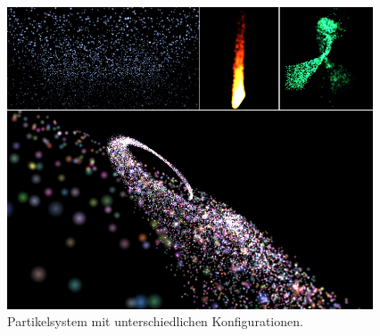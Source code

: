 \begin{Spacing}{\mylinespace}
\begin{figure}[h!]
	\centering
	\vspace*{30px}
	\includegraphics[width=410px]{graphics/ParticleResults.png}
	\caption{Partikelsystem mit unterschiedlichen Konfigurationen.}
	\label{fig:particleResults}
\end{figure}

\end{Spacing}
\newpage
\clearpage
